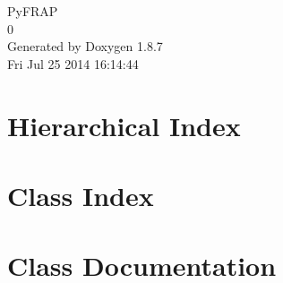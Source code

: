 \documentclass[twoside]{book}
\newcommand{\+}{\discretionary{\mbox{\scriptsize$\hookleftarrow$}}{}{}}
\newcommand{\clearemptydoublepage}{%
  \newpage{\pagestyle{empty}\cleardoublepage}%
}
\begin{document}
\hypersetup{pageanchor=false,
             bookmarks=true,
             bookmarksnumbered=true,
             pdfencoding=unicode
            }
\begin{titlepage}
\vspace*{7cm}
\begin{center}%
{\Large Py\+F\+R\+A\+P \\[1ex]\large 0 }\\
\vspace*{1cm}
{\large Generated by Doxygen 1.8.7}\\
\vspace*{0.5cm}
{\small Fri Jul 25 2014 16:14:44}\\
\end{center}
\end{titlepage}
\clearemptydoublepage
\tableofcontents
\clearemptydoublepage
{}
\hypersetup{pageanchor=true}

\chapter{Hierarchical Index}

\chapter{Class Index}

\chapter{Class Documentation}


























\newpage
{}
{}
\printindex
\end{document}
